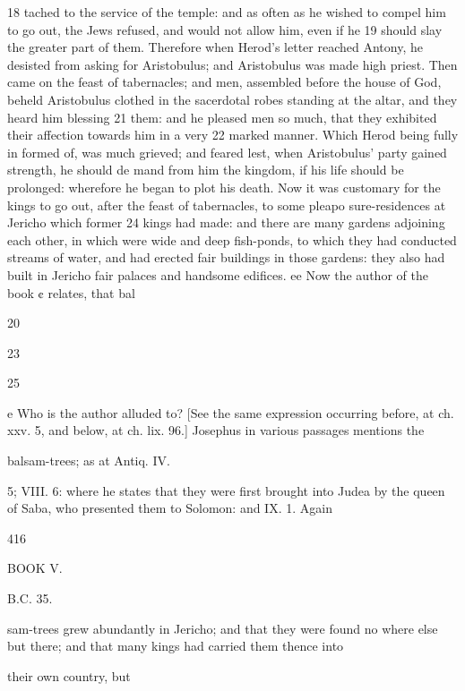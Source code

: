 18 tached to the service of the temple: and as often as he wished to compel him to go out, the Jews refused, and would not allow him, even if he 
19 should slay the greater part of them. Therefore 
when Herod’s letter reached Antony, he desisted 
from asking for Aristobulus; and Aristobulus was made high priest. 
Then came on the feast of tabernacles; and men, assembled before the house of God, beheld Aristobulus clothed in the sacerdotal robes standing at the altar, and they heard him blessing 21 them: and he pleased men so much, that they 
exhibited their affection towards him in a very 
22 marked manner. Which Herod being fully in
formed of, was much grieved; and feared lest, when 
Aristobulus’ party gained strength, he should de
mand from him the kingdom, if his life should 
be prolonged: wherefore he began to plot his death. 
Now it was customary for the kings to go out, after the feast of tabernacles, to some pleapo sure-residences at Jericho which former 24 kings had made: and there are many gardens adjoining each other, in which were wide and deep fish-ponds, to which they had conducted streams of water, and had erected fair buildings in those gardens: they also had built in Jericho fair palaces and handsome edifices. ee 
Now the author of the book ¢ relates, that bal

20 

23 

25 

e Who is the author alluded to? [See the same expression occurring before, at ch. xxv. 5, and below, at ch. lix. 96.] Josephus in various passages mentions the 

balsam-trees; as at Antiq. IV. 

5; VIII. 6: where he states that they were first brought into Judea by the queen of Saba, who presented them to Solomon: and IX. 1. Again 

416 

BOOK V. 

B.C. 35. 

sam-trees grew abundantly in Jericho; and that they were found no where else but there; and that many kings had carried them thence into 

their own country, but 

